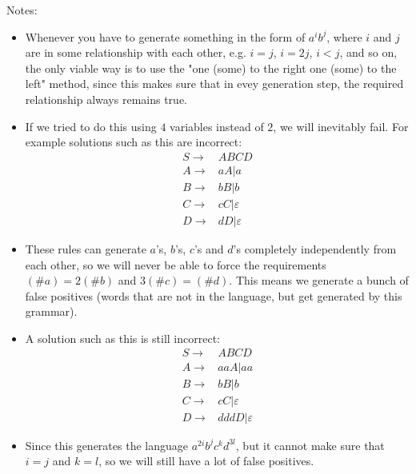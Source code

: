 Notes:
\begin{itemize}
\item Whenever you have to generate something in the form of $a^{i}b^{j}$, where $i$ and $j$ are in some relationship with each other, e.g. $i=j$, $i=2j$, $i<j$, and so on, the only viable way is to use the "one (some) to the right one (some) to the left" method, since this makes sure that in evey generation step, the required relationship always remains true.
\item If we tried to do this using $4$ variables instead of $2$, we will inevitably fail. For example solutions such as this are incorrect:
\begin{align*}
S\rightarrow{}&ABCD\\
A\rightarrow{}&aA|a\\
B\rightarrow{}&bB|b\\
C\rightarrow{}&cC|\varepsilon{}\\
D\rightarrow{}&dD|\varepsilon{}
\end{align*}
\item These rules can generate $a$'s, $b$'s, $c$'s and $d$'s completely independently from each other, so we will never be able to force the requirements $(\#a)=2(\#b)$ and $3(\#c)=(\#d)$. This means we generate a bunch of false positives (words that are not in the language, but get generated by this grammar).
\item A solution such as this is still incorrect:
\begin{align*}
    S\rightarrow{}&ABCD\\
    A\rightarrow{}&aaA|aa\\
    B\rightarrow{}&bB|b\\
    C\rightarrow{}&cC|\varepsilon{}\\
    D\rightarrow{}&dddD|\varepsilon{}
\end{align*}
\item Since this generates the language $a^{2i}b^{j}c^{k}d^{3l}$, but it cannot make sure that $i=j$ and $k=l$, so we will still have a lot of false positives.
\end{itemize}